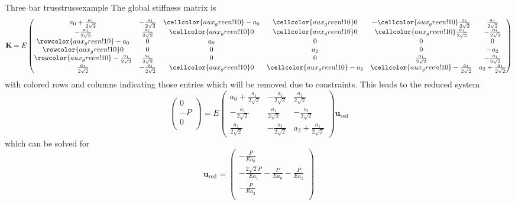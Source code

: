 \begin{example}{Three bar truss}{trussexample}
    The global stiffness matrix is 
    \begin{equation}
        \mathbf{K} = E
        \begin{pmatrix}
             a_0 + \frac{a_1}{2\sqrt{2}}&  -\frac{a_1}{2\sqrt{2}} & \cellcolor{aux_green!10}-a_0 &  \cellcolor{aux_green!10}0 & -\cellcolor{aux_green!10} \frac{a_1}{2\sqrt{2}} &  \frac{a_1}{2\sqrt{2}}\\
            -\frac{a_1}{2\sqrt{2}} &  \frac{a_1}{2\sqrt{2}} & \cellcolor{aux_green!10} 0 & \cellcolor{aux_green!10} 0 & \cellcolor{aux_green!10}\frac{a_1}{2\sqrt{2}} &  -\frac{a_1}{2\sqrt{2}} \\
            \rowcolor{aux_green!10}
             -a_0 &  0 & a_0 &  0 & 0 & 0\\
             \rowcolor{aux_green!10}
            0 &  0 & 0 &  a_2 & 0 &  -a_2 \\
            \rowcolor{aux_green!10}
             -\frac{a_1}{2\sqrt{2}} &  \frac{a_1}{2\sqrt{2}} & 0 &  0 & \frac{a_1}{2\sqrt{2}} &  -\frac{a_1}{2\sqrt{2}}\\
            \frac{a_1}{2\sqrt{2}} &  -\frac{a_1}{2\sqrt{2}} & \cellcolor{aux_green!10} 0 &  \cellcolor{aux_green!10} -a_2 & \cellcolor{aux_green!10} -\frac{a_1}{2\sqrt{2}} &  a_2 + \frac{a_1}{2\sqrt{2}}\\
        \end{pmatrix}
    \end{equation}
    with colored rows and columns indicating those entries which will be removed due to constraints. This leads to the reduced system 
    \begin{equation}
        \begin{pmatrix}
            0 \\ -P \\ 0  \\
        \end{pmatrix}
         = E
        \begin{pmatrix}
             a_0 + \frac{a_1}{2\sqrt{2}}&  -\frac{a_1}{2\sqrt{2}} &  \frac{a_1}{2\sqrt{2}}\\
            -\frac{a_1}{2\sqrt{2}} &  \frac{a_1}{2\sqrt{2}} &  -\frac{a_1}{2\sqrt{2}} \\
            \frac{a_1}{2\sqrt{2}} &  -\frac{a_1}{2\sqrt{2}} &  a_2 + \frac{a_1}{2\sqrt{2}}
        \end{pmatrix}
        \mathbf{u}_\textrm{red}
    \end{equation}
    which can be solved for 
    \begin{equation}
        \mathbf{u}_\textrm{red} = 
        \begin{pmatrix}
            -\frac{P}{Ea_0} \\  -\frac{2\sqrt{2}P}{Ea_1} - \frac{P}{Ea_0} - \frac{P}{Ea_2} \\ -\frac{P}{Ea_2}  \\
        \end{pmatrix}
    \end{equation}


\end{example}
